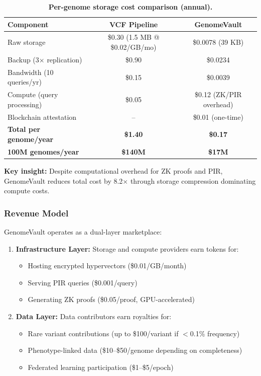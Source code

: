 \documentclass[12pt,a4paper]{article}
\begin{document}
\begin{table}[h]
\centering
\caption{\textbf{Per-genome storage cost comparison (annual).}}
\begin{tabular}{lcc}
\toprule
\textbf{Component} & \textbf{VCF Pipeline} & \textbf{GenomeVault} \\
\midrule
Raw storage & \$0.30 (1.5 MB @ \$0.02/GB/mo) & \$0.0078 (39 KB) \\
Backup (3$\times$ replication) & \$0.90 & \$0.0234 \\
Bandwidth (10 queries/yr) & \$0.15 & \$0.0039 \\
Compute (query processing) & \$0.05 & \$0.12 (ZK/PIR overhead) \\
Blockchain attestation & -- & \$0.01 (one-time) \\
\midrule
\textbf{Total per genome/year} & \textbf{\$1.40} & \textbf{\$0.17} \\
\textbf{100M genomes/year} & \textbf{\$140M} & \textbf{\$17M} \\
\bottomrule
\end{tabular}
\end{table}

\textbf{Key insight:} Despite computational overhead for ZK proofs and PIR, GenomeVault reduces total cost by 8.2$\times$ through storage compression dominating compute costs.

\subsubsection{Revenue Model}

GenomeVault operates as a dual-layer marketplace:

\begin{enumerate}
\item \textbf{Infrastructure Layer:} Storage and compute providers earn tokens for:
\begin{itemize}
\item Hosting encrypted hypervectors (\$0.01/GB/month)
\item Serving PIR queries (\$0.001/query)
\item Generating ZK proofs (\$0.05/proof, GPU-accelerated)
\end{itemize}

\item \textbf{Data Layer:} Data contributors earn royalties for:
\begin{itemize}
\item Rare variant contributions (up to \$100/variant if $<$0.1\% frequency)
\item Phenotype-linked data (\$10--\$50/genome depending on completeness)
\item Federated learning participation (\$1--\$5/epoch)
\end{itemize}
\end{enumerate}
\end{document}
